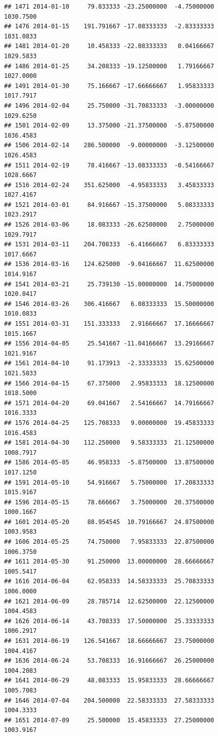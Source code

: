 \documentclass[
]{article}
\begin{document}
\begin{verbatim}
## 1471 2014-01-10     79.833333 -23.25000000  -4.75000000    1030.7500
## 1476 2014-01-15    191.791667 -17.08333333  -2.83333333    1031.0833
## 1481 2014-01-20     10.458333 -22.08333333   0.04166667    1029.5833
## 1486 2014-01-25     34.208333 -19.12500000   1.79166667    1027.0000
## 1491 2014-01-30     75.166667 -17.66666667   1.95833333    1017.7917
## 1496 2014-02-04     25.750000 -31.70833333  -3.00000000    1029.6250
## 1501 2014-02-09     13.375000 -21.37500000  -5.87500000    1036.4583
## 1506 2014-02-14    286.500000  -9.00000000  -3.12500000    1026.4583
## 1511 2014-02-19     78.416667 -13.08333333  -0.54166667    1028.6667
## 1516 2014-02-24    351.625000  -4.95833333   3.45833333    1027.4167
## 1521 2014-03-01     84.916667 -15.37500000   5.08333333    1023.2917
## 1526 2014-03-06     18.083333 -26.62500000   2.75000000    1029.7917
## 1531 2014-03-11    204.708333  -6.41666667   6.83333333    1017.6667
## 1536 2014-03-16    124.625000  -9.04166667  11.62500000    1014.9167
## 1541 2014-03-21     25.739130 -15.00000000  14.75000000    1020.0417
## 1546 2014-03-26    306.416667   6.08333333  15.50000000    1010.0833
## 1551 2014-03-31    151.333333   2.91666667  17.16666667    1015.1667
## 1556 2014-04-05     25.541667 -11.04166667  13.29166667    1021.9167
## 1561 2014-04-10     91.173913  -2.33333333  15.62500000    1021.5833
## 1566 2014-04-15     67.375000   2.95833333  18.12500000    1018.5000
## 1571 2014-04-20     69.041667   2.54166667  14.79166667    1016.3333
## 1576 2014-04-25    125.708333   9.00000000  19.45833333    1016.4583
## 1581 2014-04-30    112.250000   9.58333333  21.12500000    1008.7917
## 1586 2014-05-05     46.958333  -5.87500000  13.87500000    1017.1250
## 1591 2014-05-10     54.916667   5.75000000  17.20833333    1015.9167
## 1596 2014-05-15     78.666667   3.75000000  20.37500000    1000.1667
## 1601 2014-05-20     88.954545  10.79166667  24.87500000    1003.9583
## 1606 2014-05-25     74.750000   7.95833333  22.87500000    1006.3750
## 1611 2014-05-30     91.250000  13.00000000  28.66666667    1005.5417
## 1616 2014-06-04     62.958333  14.58333333  25.70833333    1006.0000
## 1621 2014-06-09     28.785714  12.62500000  22.12500000    1004.4583
## 1626 2014-06-14     43.708333  17.50000000  25.33333333    1006.2917
## 1631 2014-06-19    126.541667  18.66666667  23.75000000    1004.4167
## 1636 2014-06-24     53.708333  16.91666667  26.25000000    1004.2083
## 1641 2014-06-29     48.083333  15.95833333  28.66666667    1005.7083
## 1646 2014-07-04    204.500000  22.58333333  27.58333333    1004.3333
## 1651 2014-07-09     25.500000  15.45833333  27.25000000    1003.9167

\end{verbatim}
\end{document}
